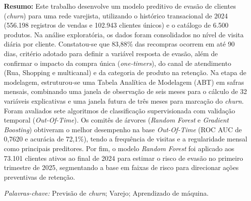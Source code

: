 \textbf{Resumo: }Este trabalho desenvolve um modelo preditivo de evasão de clientes (\textit{churn}) para uma rede varejista, utilizando o histórico transacional de 2024 (556.198 registros de vendas e 102.943 clientes únicos) e o catálogo de 6.500 produtos. 
Na análise exploratória, os dados foram consolidados no nível de visita diária por cliente. 
Constatou-se que 83,88\% das recompras ocorrem em até 90 dias, critério adotado para definir a variável resposta de evasão, além de confirmar o impacto da compra única (\textit{one-timers}), do canal de atendimento (Rua, Shopping e multicanal) e da categoria de produto na retenção. 
Na etapa de modelagem, estruturou-se uma Tabela Analítica de Modelagem (ABT) em safras mensais, combinando uma janela de observação de seis meses para o cálculo de 32 variáveis explicativas e uma janela futura de três meses para marcação do \textit{churn}. 
Foram avaliados sete algoritmos de classificação supervisionada com validação temporal (\textit{Out-Of-Time}). 
Os comitês de árvores (\textit{Random Forest} e \textit{Gradient Boosting}) obtiveram o melhor desempenho na base \textit{Out-Of-Time} (ROC AUC de 0,7620 e acurácia de 72,1\%), tendo a frequência de visitas e a regularidade mensal como principais preditores. 
Por fim, o modelo \textit{Random Forest} foi aplicado aos 73.101 clientes ativos ao final de 2024 para estimar o risco de evasão no primeiro trimestre de 2025, segmentando a base em faixas de risco para direcionar ações preventivas de retenção.

\vspace{0.5cm}
\noindent\textit{Palavras-chave: }Previsão de \textit{churn}; Varejo; Aprendizado de máquina.